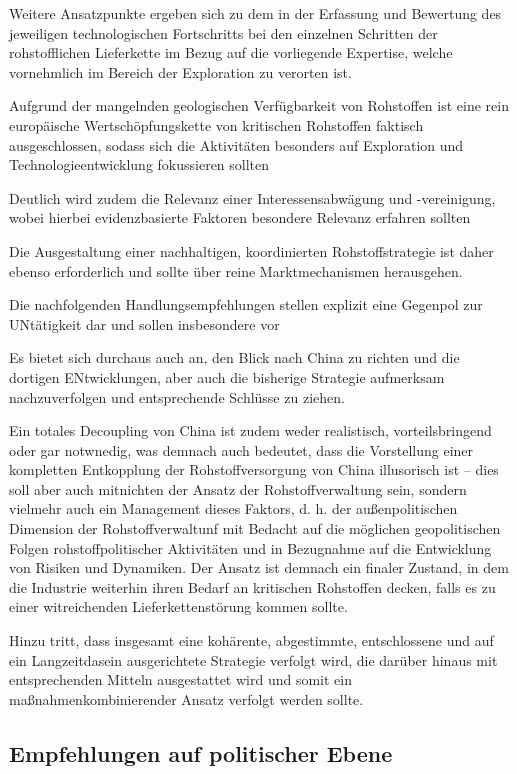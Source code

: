 \documentclass[12pt,a4paper,oneside]{book} %
\begin{document}
Weitere Ansatzpunkte ergeben sich zu dem in der Erfassung und Bewertung des jeweiligen technologischen Fortschritts bei den einzelnen Schritten der rohstofflichen Lieferkette im Bezug auf die vorliegende Expertise, welche vornehmlich im Bereich der Exploration zu verorten ist.

Aufgrund der mangelnden geologischen Verfügbarkeit von Rohstoffen ist eine rein europäische Wertschöpfungskette von kritischen Rohstoffen faktisch ausgeschlossen, sodass sich die Aktivitäten besonders auf Exploration und Technologieentwicklung fokussieren sollten

Deutlich wird zudem die Relevanz einer Interessensabwägung und -vereinigung, wobei hierbei evidenzbasierte Faktoren besondere Relevanz erfahren sollten

Die Ausgestaltung einer nachhaltigen, koordinierten Rohstoffstrategie ist daher ebenso erforderlich und sollte über reine Marktmechanismen herausgehen.

Die nachfolgenden Handlungsempfehlungen stellen explizit eine Gegenpol zur UNtätigkeit dar und sollen insbesondere vor 

Es bietet sich durchaus auch an, den Blick nach China zu richten und die dortigen ENtwicklungen, aber auch die bisherige Strategie aufmerksam nachzuverfolgen und entsprechende Schlüsse zu ziehen.

Ein totales Decoupling von China ist zudem weder realistisch, vorteilsbringend oder gar notwnedig, was demnach auch bedeutet, dass die Vorstellung einer kompletten Entkopplung der Rohstoffversorgung von China illusorisch ist -- dies soll aber auch mitnichten der Ansatz der Rohstoffverwaltung sein, sondern vielmehr auch ein Management dieses Faktors, d. h. der außenpolitischen Dimension der Rohstoffverwaltunf mit Bedacht auf die möglichen geopolitischen Folgen rohstoffpolitischer Aktivitäten und in Bezugnahme auf die Entwicklung von Risiken und Dynamiken. Der Ansatz ist demnach ein finaler Zustand, in dem die Industrie weiterhin ihren Bedarf an kritischen Rohstoffen decken, falls es zu einer witreichenden Lieferkettenstörung kommen sollte.

Hinzu tritt, dass insgesamt eine kohärente, abgestimmte, entschlossene und auf ein Langzeitdasein ausgerichtete Strategie verfolgt wird, die darüber hinaus mit entsprechenden Mitteln ausgestattet wird und somit ein maßnahmenkombinierender Ansatz verfolgt werden sollte.


\subsection{Empfehlungen auf politischer Ebene}
\end{document}
